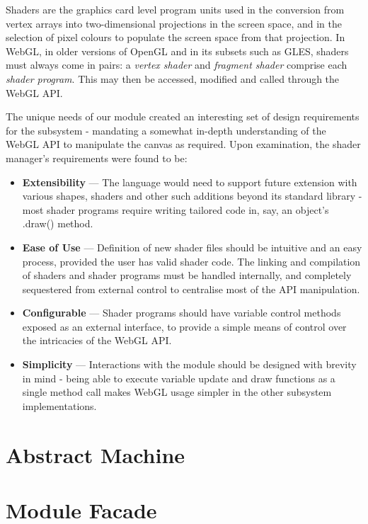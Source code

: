 \documentclass{l3proj}
\begin{document}
Shaders are the graphics card level program units used in the conversion from vertex arrays into two-dimensional projections in the screen space, and in the selection of pixel colours to populate the screen space from that projection. In WebGL, in older versions of OpenGL and in its subsets such as GLES, shaders must always come in pairs: a \textit{vertex shader} and \textit{fragment shader} comprise each \textit{shader program}. This may then be accessed, modified and called through the WebGL API.

The unique needs of our module created an interesting set of design requirements for the subsystem - mandating a somewhat in-depth understanding of the WebGL API to manipulate the canvas as required. Upon examination, the shader manager's requirements were found to be:
\begin{itemize}
\item \textbf{Extensibility} --- The language would need to support future extension with various shapes, shaders and other such additions beyond its standard library - most shader programs require writing tailored code in, say, an object's .draw() method.
\item \textbf{Ease of Use} --- Definition of new shader files should be intuitive and an easy process, provided the user has valid shader code. The linking and compilation of shaders and shader programs must be handled internally, and completely sequestered from external control to centralise most of the API manipulation.
\item \textbf{Configurable} --- Shader programs should have variable control methods exposed as an external interface, to provide a simple means of control over the intricacies of the WebGL API.
\item \textbf{Simplicity} --- Interactions with the module should be designed with brevity in mind - being able to execute variable update and draw functions as a single method call makes WebGL usage simpler in the other subsystem implementations.
\end{itemize}

\section{Abstract Machine}
\label{arch-abs}

\section{Module Facade}
\label{arch-module}
\end{document}
